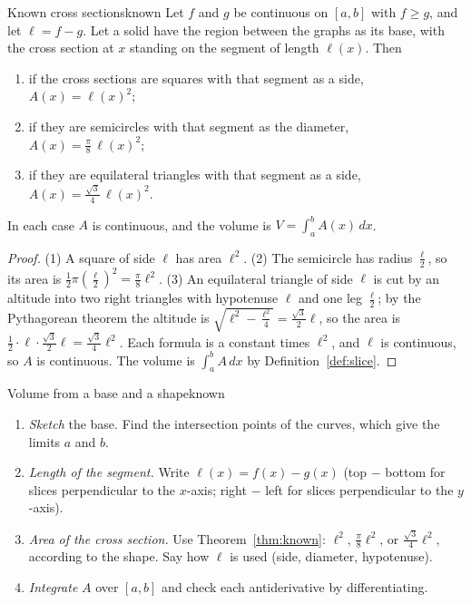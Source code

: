 \documentclass[11pt]{article}
\begin{document}
\begin{thm}{Known cross sections}{known}
Let $f$ and $g$ be continuous on $[a,b]$ with $f\ge g$, and let $\ell=f-g$. Let a solid have the region between the graphs as its base, with the cross section at $x$ standing on the segment of length $\ell(x)$. Then
\begin{enumerate}[label=(\arabic*),nosep]
  \item if the cross sections are squares with that segment as a side, $A(x)=\ell(x)^2$;
  \item if they are semicircles with that segment as the diameter, $A(x)=\frac\pi8\,\ell(x)^2$;
  \item if they are equilateral triangles with that segment as a side, $A(x)=\frac{\sqrt3}4\,\ell(x)^2$.
\end{enumerate}
In each case $A$ is continuous, and the volume is $V=\int_a^bA(x)\,dx$.
\end{thm}
\begin{proof}
(1) A square of side $\ell$ has area $\ell^2$. (2) The semicircle has radius $\frac\ell2$, so its area is $\frac12\pi\left(\frac\ell2\right)^2=\frac\pi8\ell^2$. (3) An equilateral triangle of side $\ell$ is cut by an altitude into two right triangles with hypotenuse $\ell$ and one leg $\frac\ell2$; by the Pythagorean theorem the altitude is $\sqrt{\ell^2-\frac{\ell^2}4}=\frac{\sqrt3}2\ell$, so the area is $\frac12\cdot\ell\cdot\frac{\sqrt3}2\ell=\frac{\sqrt3}4\ell^2$. Each formula is a constant times $\ell^2$, and $\ell$ is continuous, so $A$ is continuous. The volume is $\int_a^bA\,dx$ by Definition~\ref{def:slice}.
\end{proof}

\begin{proc}{Volume from a base and a shape}{known}
\begin{enumerate}[nosep]
  \item \emph{Sketch} the base. Find the intersection points of the curves, which give the limits $a$ and $b$.
  \item \emph{Length of the segment.} Write $\ell(x)=f(x)-g(x)$ (top $-$ bottom for slices perpendicular to the $x$-axis; right $-$ left for slices perpendicular to the $y$-axis).
  \item \emph{Area of the cross section.} Use Theorem~\ref{thm:known}: $\ell^2$, $\frac\pi8\ell^2$, or $\frac{\sqrt3}4\ell^2$, according to the shape. Say how $\ell$ is used (side, diameter, hypotenuse).
  \item \emph{Integrate} $A$ over $[a,b]$ and check each antiderivative by differentiating.
\end{enumerate}
\end{proc}
\end{document}
